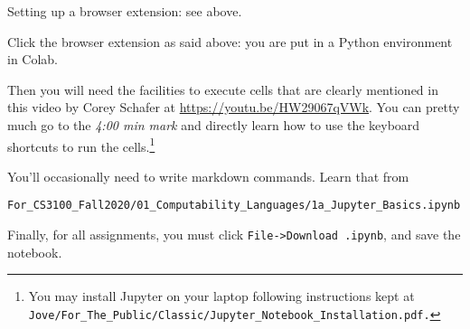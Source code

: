 \documentclass[12pt]{article}
\begin{document}
\begin{compactenum}
\item Setting up a browser extension: see above.
\item Click the browser extension as said above: you are put in a Python environment
  in Colab.
\item Then you will need the facilities to execute cells that
  are clearly mentioned in this video
  by Corey Schafer at \url{https://youtu.be/HW29067qVWk}.
  You can pretty much go to the {\em 4:00 min mark} and directly
  learn how to use the keyboard shortcuts to run the cells.\footnote{You may
    install Jupyter on your laptop following instructions
    kept at {\tt Jove/For\_The\_Public/Classic/Jupyter\_Notebook\_Installation.pdf.}}
\item You'll occasionally need to write markdown commands. Learn that from
\item[]    
{\footnotesize \verb|For_CS3100_Fall2020/01_Computability_Languages/1a_Jupyter_Basics.ipynb|}

\item Finally, for all assignments, you must
  click \verb|File->Download .ipynb|, and save the notebook.
\end{compactenum}
\end{document}
